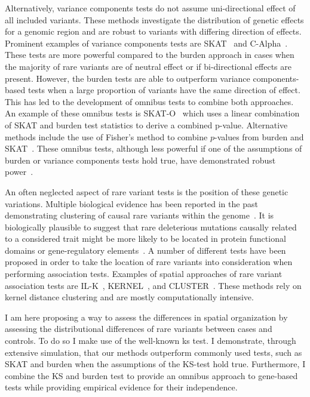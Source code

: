 Alternatively, variance components tests do not assume uni-directional effect of all included variants. 
These methods investigate the distribution of genetic effects for a genomic region and are robust to variants with differing direction of effects.
Prominent examples of variance components tests are SKAT~\cite{Wu2011} and C-Alpha~\cite{Neale2011}.
These tests are more powerful compared to the burden approach in cases when the majority of rare variants are of neutral effect or if bi-directional effects are present.
However, the burden tests are able to outperform variance components-based tests when a large proportion of variants have the same direction of effect.
This has led to the development of omnibus tests to combine both approaches.
An example of these omnibus tests is SKAT-O~\cite{Lee2012a} which uses a linear combination of SKAT and burden test statistics to derive a combined p-value.
Alternative methods include the use of Fisher's method to combine $p$-values from burden and SKAT~\cite{Derkach2013a}.
These omnibus tests, although less powerful if one of the assumptions of burden or variance components tests hold true, have demonstrated robust power~\cite{Lee2014}. 

An often neglected aspect of rare variant tests is the position of these genetic variations.
Multiple biological evidence has been reported in the past demonstrating clustering of causal rare variants within the genome~\cite{Ionita-Laza2012, Raab2010,Schaid2013,Fier2012}.
It is biologically plausible to suggest that rare deleterious mutations causally related to a considered trait might be more likely to be located in protein functional domains or gene-regulatory elements~\cite{Fier2012}.
A number of different tests have been proposed in order to take the location of rare variants into consideration when performing association tests.
Examples of spatial approaches of rare variant association tests are IL-K~\cite{Ionita-Laza2012}, KERNEL~\cite{Schaid2013}, and CLUSTER~\cite{Lin2014}.
These methods rely on kernel distance clustering and are mostly computationally intensive.

I am here proposing a way to assess the differences in spatial organization by assessing the distributional differences of rare variants between cases and controls.
To do so I make use of the well-known \acrfull{ks} test.
I demonstrate, through extensive simulation, that our methods outperform commonly used tests, such as SKAT and burden when the assumptions of the KS-test hold true.
Furthermore, I combine the KS and burden test to provide an omnibus approach to gene-based tests while providing empirical evidence for their independence.
